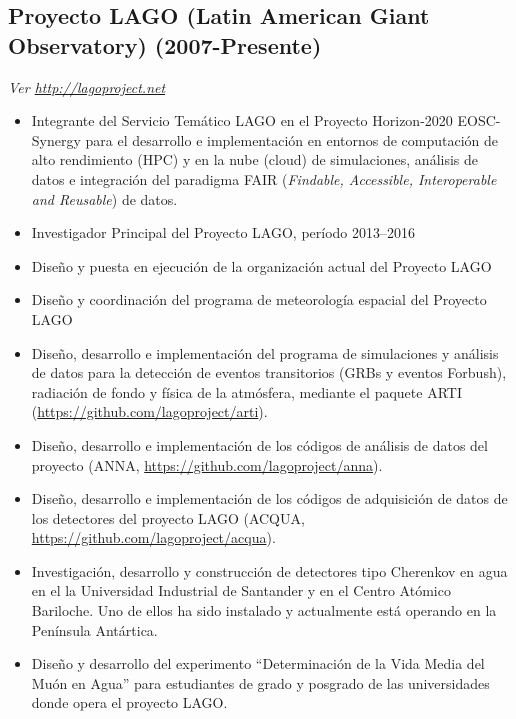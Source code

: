 \subsection*{Proyecto LAGO (Latin American Giant Observatory) (2007-Presente)}
{\small{\textit{Ver \href{http://lagoproject.net}{http://lagoproject.net}}}}
\begin{itemize}

\item Integrante del Servicio Temático LAGO en el Proyecto Horizon-2020 EOSC-Synergy para el desarrollo e implementación en entornos de computación de alto rendimiento (HPC) y en la nube (cloud) de simulaciones, análisis de datos e integración del paradigma FAIR (\emph{Findable, Accessible, Interoperable and Reusable}) de datos.
\item Investigador Principal del Proyecto LAGO, período 2013--2016
\item Diseño y puesta en ejecución de la organización actual del Proyecto LAGO
\item Diseño y coordinación del programa de meteorología espacial del Proyecto LAGO
\item Diseño, desarrollo e implementación del programa de simulaciones y análisis de datos para la detección de eventos transitorios (GRBs y eventos Forbush), radiación de fondo y física de la atmósfera, mediante el paquete ARTI (\href{https://github.com/lagoproject/arti}{https://github.com/lagoproject/arti}).
\item Diseño, desarrollo e implementación de los códigos de análisis de datos del proyecto (ANNA, \href{https://github.com/lagoproject/anna}{https://github.com/lagoproject/anna}).
\item Diseño, desarrollo e implementación de los códigos de adquisición de datos de los detectores del proyecto LAGO (ACQUA, \href{https://github.com/lagoproject/acqua}{https://github.com/lagoproject/acqua}).
\item Investigación, desarrollo y construcción de detectores tipo Cherenkov en agua en el la Universidad Industrial de Santander y en el Centro Atómico Bariloche.
Uno de ellos ha sido instalado y actualmente está operando en la Península Antártica.
\item Diseño y desarrollo del experimento ``Determinación de la Vida Media del Muón en Agua'' para estudiantes de grado y posgrado de las universidades donde opera el proyecto LAGO\@.
\end{itemize}
